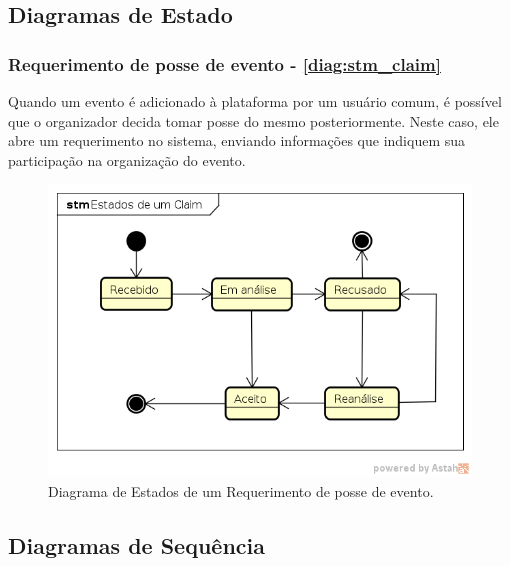 \documentclass[12pt,a4paper,twoside,hyphens,english,brazil]{abntex2}
\begin{document}
{\subsection{Diagramas de Estado}

\subsubsection*{Requerimento de posse de evento - \autoref{diag:stm_claim}}
Quando um evento é adicionado à plataforma por um usuário comum, é possível que o organizador decida tomar posse do mesmo posteriormente. Neste caso, ele abre um requerimento no sistema, enviando informações que indiquem sua participação na organização do evento.

\begin{figure}
	\centering
	\includegraphics[width=0.8\linewidth]{diagramas/comuns/stm_claim.png}
	\caption{Diagrama de Estados de um Requerimento de posse de evento.}
	\label{diag:stm_claim}
\end{figure}

\subsection{Diagramas de Sequência}

}
\end{document}
